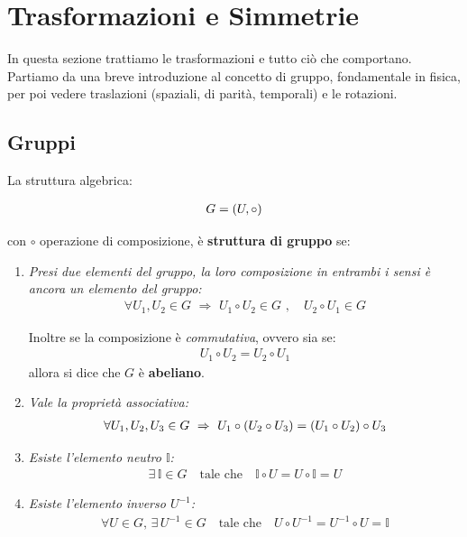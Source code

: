 \section{Trasformazioni e Simmetrie}

	In questa sezione trattiamo le trasformazioni e tutto ciò che comportano. Partiamo da una breve introduzione al concetto di gruppo, fondamentale in fisica, per poi vedere traslazioni (spaziali, di parità, temporali) e le rotazioni.

\subsection{Gruppi}
	
	La struttura algebrica:
	
\begin{align*}
	G = \qty(U, \circ)
\end{align*}

	con $\circ$ operazione di composizione, è \textbf{struttura di gruppo} se:

\begin{enumerate}[label=\arabic*)]
	\item \textit{Presi due elementi del gruppo, la loro composizione in entrambi i sensi è ancora un elemento del gruppo:}
	\begin{align*}
		\forall U_1, U_2 \in G \,\, \Rightarrow \,\, U_1 \circ U_2 \in G \, \, , \quad U_2 \circ U_1 \in G
	\end{align*}
	\begin{myapprf}
		Inoltre se la composizione è \textit{commutativa}, ovvero sia se:
	\begin{align*}
		U_1 \circ U_2 = U_2 \circ U_1
	\end{align*}
		allora si dice che $G$ è \textbf{abeliano}.
	\end{myapprf}
	
	\item \textit{Vale la proprietà associativa:}
	\begin{align*}
		\forall U_1, U_2, U_3 \in G \,\, \Rightarrow \,\, U_1 \circ \qty(U_2 \circ U_3) = \qty(U_1 \circ U_2) \circ U_3
	\end{align*}

	\item \textit{Esiste l'elemento neutro $\mathbb{I}$:}
	\begin{align*}
		\exists \, \mathbb{I} \in G \quad \text{tale che} \quad \mathbb{I} \circ U = U \circ \mathbb{I} = U 
	\end{align*}

	\item \textit{Esiste l'elemento inverso $U^{-1}$:}
	\begin{align*}
		\forall U \in G, \, \exists \, U^{-1} \in G \quad \text{tale che} \quad U \circ U^{-1} = U^{-1} \circ U = \mathbb{I}
	\end{align*}

\end{enumerate}

